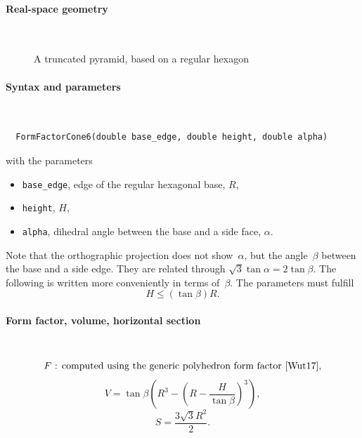 \paragraph{Real-space geometry}\strut\\

\begin{figure}[H]
\hfill
{}
\hfill
{}
\hfill
{}
\hfill
\caption{A truncated pyramid, based on a regular hexagon}
\end{figure}

\FloatBarrier
\paragraph{Syntax and parameters}\strut\\[-2ex plus .2ex minus .2ex]
\begin{lstlisting}
  FormFactorCone6(double base_edge, double height, double alpha)
\end{lstlisting}
with the parameters
\begin{itemize}
\item \texttt{base\_edge}, edge of the regular hexagonal base, $R$,
\item \texttt{height}, $H$,
\item \texttt{alpha}, dihedral angle between the base and a side face, $\alpha$.
\end{itemize}
Note that the orthographic projection does not show~$\alpha$,
but the angle~$\beta$ between the base and a side edge.
They are related through $\sqrt{3}\tan \alpha = 2 \tan \beta$.
The following is written more conveniently in terms of~$\beta$.
The parameters must fulfill
\begin{displaymath}
  H \le (\tan\beta)R.
\end{displaymath}

\paragraph{Form factor, volume, horizontal section}\strut\\
\begin{equation*}
  F \text{~: computed using the generic polyhedron form factor~\cite{Wut17},}
\end{equation*}
\begin{equation*}
  V = \tan\beta  \left( R^3- \left(R-\frac{H}{\tan\beta}\right)^3 \right),
\end{equation*}
\begin{equation*}
  S =\dfrac{3\sqrt{3}R^2}{2}.
\end{equation*}


